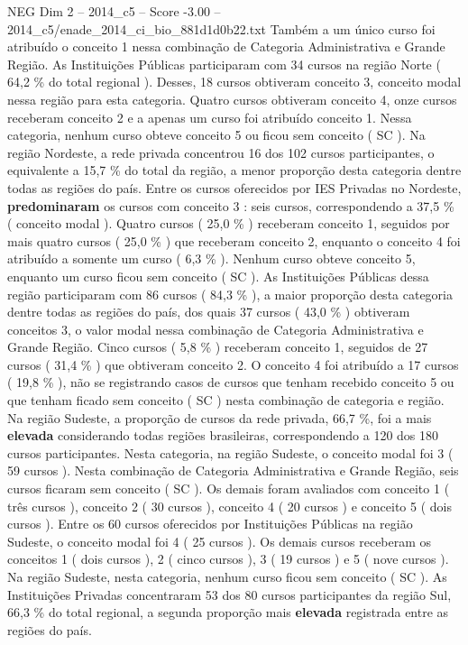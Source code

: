 \begin{textsample}{NEG Dim 2 – 2014\_c5 – Score -3.00 – 2014\_c5/enade\_2014\_ci\_bio\_881d1d0b22.txt}
Também a um único curso foi atribuído o conceito 1 nessa combinação de Categoria Administrativa e Grande Região.
As Instituições Públicas participaram com 34 cursos na região Norte ( 64,2 \% do total regional ).
Desses, 18 cursos obtiveram conceito 3, conceito modal nessa região para esta categoria.
Quatro cursos obtiveram conceito 4, onze cursos receberam conceito 2 e a apenas um curso foi atribuído conceito 1.
Nessa categoria, nenhum curso obteve conceito 5 ou ficou sem conceito ( SC ).
Na região Nordeste, a rede privada concentrou 16 dos 102 cursos participantes, o equivalente a 15,7 \% do total da região, a menor proporção desta categoria dentre todas as regiões do país.
Entre os cursos oferecidos por IES Privadas no Nordeste, \textbf{predominaram} os cursos com conceito 3 : seis cursos, correspondendo a 37,5 \% ( conceito modal ).
Quatro cursos ( 25,0 \% ) receberam conceito 1, seguidos por mais quatro cursos ( 25,0 \% ) que receberam conceito 2, enquanto o conceito 4 foi atribuído a somente um curso ( 6,3 \% ).
Nenhum curso obteve conceito 5, enquanto um curso ficou sem conceito ( SC ).
As Instituições Públicas dessa região participaram com 86 cursos ( 84,3 \% ), a maior proporção desta categoria dentre todas as regiões do país, dos quais 37 cursos ( 43,0 \% ) obtiveram conceitos 3, o valor modal nessa combinação de Categoria Administrativa e Grande Região.
Cinco cursos ( 5,8 \% ) receberam conceito 1, seguidos de 27 cursos ( 31,4 \% ) que obtiveram conceito 2.
O conceito 4 foi atribuído a 17 cursos ( 19,8 \% ), não se registrando casos de cursos que tenham recebido conceito 5 ou que tenham ficado sem conceito ( SC ) nesta combinação de categoria e região.
Na região Sudeste, a proporção de cursos da rede privada, 66,7 \%, foi a mais \textbf{elevada} considerando todas regiões brasileiras, correspondendo a 120 dos 180 cursos participantes.
Nesta categoria, na região Sudeste, o conceito modal foi 3 ( 59 cursos ).
Nesta combinação de Categoria Administrativa e Grande Região, seis cursos ficaram sem conceito ( SC ).
Os demais foram avaliados com conceito 1 ( três cursos ), conceito 2 ( 30 cursos ), conceito 4 ( 20 cursos ) e conceito 5 ( dois cursos ).
Entre os 60 cursos oferecidos por Instituições Públicas na região Sudeste, o conceito modal foi 4 ( 25 cursos ).
Os demais cursos receberam os conceitos 1 ( dois cursos ), 2 ( cinco cursos ), 3 ( 19 cursos ) e 5 ( nove cursos ).
Na região Sudeste, nesta categoria, nenhum curso ficou sem conceito ( SC ).
As Instituições Privadas concentraram 53 dos 80 cursos participantes da região Sul, 66,3 \% do total regional, a segunda proporção mais \textbf{elevada} registrada entre as regiões do país.

\end{textsample}
